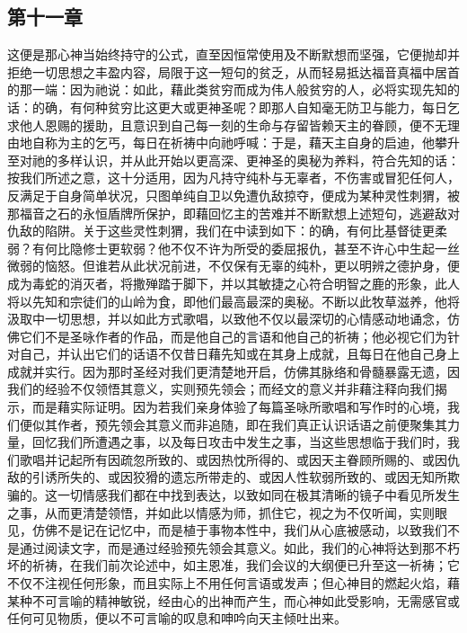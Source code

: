 
\subsection{第十一章}

\par

这便是那心神当始终持守的公式，直至因恒常使用及不断默想而坚强，它便抛却并拒绝一切思想之丰盈内容，局限于这一短句的贫乏，从而轻易抵达福音真福中居首的那一端：因为祂说：如此，藉此类贫穷而成为伟人般贫穷的人，必将实现先知的话：的确，有何种贫穷比这更大或更神圣呢？即那人自知毫无防卫与能力，每日乞求他人恩赐的援助，且意识到自己每一刻的生命与存留皆赖天主的眷顾，便不无理由地自称为主的乞丐，每日在祈祷中向祂呼喊：于是，藉天主自身的启迪，他攀升至对祂的多样认识，并从此开始以更高深、更神圣的奥秘为养料，符合先知的话：按我们所述之意，这十分适用，因为凡持守纯朴与无辜者，不伤害或冒犯任何人，反满足于自身简单状况，只图单纯自卫以免遭仇敌掠夺，便成为某种灵性刺猬，被那福音之石的永恒盾牌所保护，即藉回忆主的苦难并不断默想上述短句，逃避敌对仇敌的陷阱。关于这些灵性刺猬，我们在中读到如下：的确，有何比基督徒更柔弱？有何比隐修士更软弱？他不仅不许为所受的委屈报仇，甚至不许心中生起一丝微弱的恼怒。但谁若从此状况前进，不仅保有无辜的纯朴，更以明辨之德护身，便成为毒蛇的消灭者，将撒殚踏于脚下，并以其敏捷之心符合明智之鹿的形象，此人将以先知和宗徒们的山岭为食，即他们最高最深的奥秘。不断以此牧草滋养，他将汲取中一切思想，并以如此方式歌唱，以致他不仅以最深切的心情感动地诵念，仿佛它们不是圣咏作者的作品，而是他自己的言语和他自己的祈祷；他必视它们为针对自己，并认出它们的话语不仅昔日藉先知或在其身上成就，且每日在他自己身上成就并实行。因为那时圣经对我们更清楚地开启，仿佛其脉络和骨髓暴露无遗，因我们的经验不仅领悟其意义，实则预先领会；而经文的意义并非藉注释向我们揭示，而是藉实际证明。因为若我们亲身体验了每篇圣咏所歌唱和写作时的心境，我们便似其作者，预先领会其意义而非追随，即在我们真正认识话语之前便聚集其力量，回忆我们所遭遇之事，以及每日攻击中发生之事，当这些思想临于我们时，我们歌唱并记起所有因疏忽所致的、或因热忱所得的、或因天主眷顾所赐的、或因仇敌的引诱所失的、或因狡猾的遗忘所带走的、或因人性软弱所致的、或因无知所欺骗的。这一切情感我们都在中找到表达，以致如同在极其清晰的镜子中看见所发生之事，从而更清楚领悟，并如此以情感为师，抓住它，视之为不仅听闻，实则眼见，仿佛不是记在记忆中，而是植于事物本性中，我们从心底被感动，以致我们不是通过阅读文字，而是通过经验预先领会其意义。如此，我们的心神将达到那不朽坏的祈祷，在我们前次论述中，如主恩准，我们会议的大纲便已升至这一祈祷；它不仅不注视任何形象，而且实际上不用任何言语或发声；但心神目的燃起火焰，藉某种不可言喻的精神敏锐，经由心的出神而产生，而心神如此受影响，无需感官或任何可见物质，便以不可言喻的叹息和呻吟向天主倾吐出来。\par

